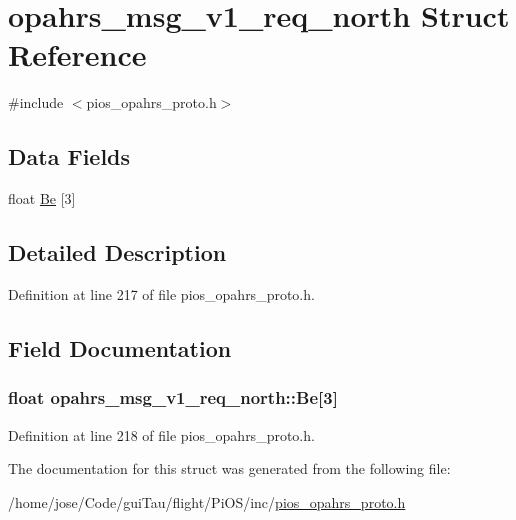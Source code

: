 \hypertarget{structopahrs__msg__v1__req__north}{\section{opahrs\-\_\-msg\-\_\-v1\-\_\-req\-\_\-north Struct Reference}
\label{structopahrs__msg__v1__req__north}
}


{\ttfamily \#include $<$pios\-\_\-opahrs\-\_\-proto.\-h$>$}

\subsection*{Data Fields}
\begin{DoxyCompactItemize}
\item 
float \hyperlink{structopahrs__msg__v1__req__north_a443d514462348fec1fc7d8ae73cc0443}{Be} \mbox{[}3\mbox{]}
\end{DoxyCompactItemize}


\subsection{Detailed Description}


Definition at line 217 of file pios\-\_\-opahrs\-\_\-proto.\-h.



\subsection{Field Documentation}
\hypertarget{structopahrs__msg__v1__req__north_a443d514462348fec1fc7d8ae73cc0443}{
\subsubsection[{Be}]{\setlength{\rightskip}{0pt plus 5cm}float opahrs\-\_\-msg\-\_\-v1\-\_\-req\-\_\-north\-::\-Be\mbox{[}3\mbox{]}}}\label{structopahrs__msg__v1__req__north_a443d514462348fec1fc7d8ae73cc0443}


Definition at line 218 of file pios\-\_\-opahrs\-\_\-proto.\-h.



The documentation for this struct was generated from the following file\-:\begin{DoxyCompactItemize}
\item 
/home/jose/\-Code/gui\-Tau/flight/\-Pi\-O\-S/inc/\hyperlink{pios__opahrs__proto_8h}{pios\-\_\-opahrs\-\_\-proto.\-h}\end{DoxyCompactItemize}
